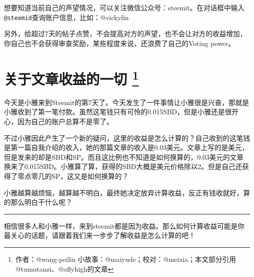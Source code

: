 \documentclass[]{ctexbook}
\begin{document}
想要知道当前自己的声望情况，可以关注微信公众号：steemit。在对话框中输入\texttt{@steemid}查询账户信息，比如：@vickylin

另外，给超过7天的帖子点赞，不会提高对方的声望，也不会让对方的收益增加，你自己也不会获得审查奖励，某些程度来说，还浪费了自己的Voting power。

\section[关于文章收益的一切 ]{\texorpdfstring{关于文章收益的一切 \footnote{作者：@wang-peilin 小故事：@maiyude；校对：@meixia；本文部分引用@tumutanzi、@oflyhigh的文章}}{关于文章收益的一切 }}

今天是小雅来到Steemit的第7天了。今天发生了一件事情让小雅很是兴奋，那就是小雅收到了第一笔付款。虽然这笔钱只有可怜的0.015SBD，但是小雅还是很开心，因为自己的账户总算不是零了。

不过小雅因此产生了一个新的疑问，这里的收益是怎么计算的？自己收到的这笔钱是第一篇自我介绍的收入，她的那篇文章的收入是0.03美元。文章上写的是美元，但是发来的却是SBD和SP。而且这比例也不知道是如何换算的，0.03美元的文章换来了0.015SBD。小雅算了算，获得的SBD大概是美元价格除以2。但是自己还获得了零点零几的SP，这又是如何换算的？

小雅越算越烦恼，越算越不明白，最终她决定放弃计算收益，反正有钱收就好，算的那么明白干什么呢？

\begin{center}\rule{0.5\linewidth}{\linethickness}\end{center}

相信很多人和小雅一样，来到steemit都是因为收益。那么如何计算收益可能是你最关心的话题，请跟着我们来一步步了解收益是怎么计算的吧！
\end{document}

